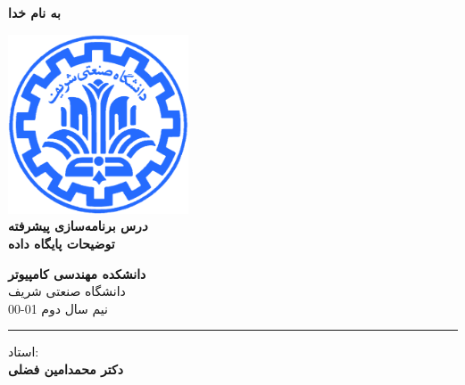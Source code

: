 \documentclass[]{article}
\begin{document}
\begin{titlepage}
\begin{center}


\textbf{ \Huge{به نام خدا} }
        
\vspace{0.2cm}

\includegraphics[width=0.4\textwidth]{sharif1.png}\\
\vspace{0.2cm}
\textbf{ \Huge{\emph درس برنامه‌سازی پیشرفته} }\\
\vspace{0.25cm}
\textbf{ \Large{ توضیحات پایگاه داده} }
\vspace{0.2cm}
       
 
      \large \textbf{دانشکده مهندسی کامپیوتر}\\\vspace{0.1cm}
    \large   دانشگاه صنعتی شریف\\\vspace{0.2cm}
       \large   ﻧﯿﻢ سال دوم 01-00 \\\vspace{0.10cm}
      \noindent\rule[1ex]{\linewidth}{1pt}
استاد:\\
    \textbf{{دکتر محمدامین فضلی}}



    \vspace{0.20cm}


    

\end{center}
\end{titlepage}


\newpage
\pagestyle{fancy}
\fancyhf{}
\fancyfoot{}
\cfoot{\thepage}
\renewcommand{\headrulewidth}{2pt}
\end{document}
